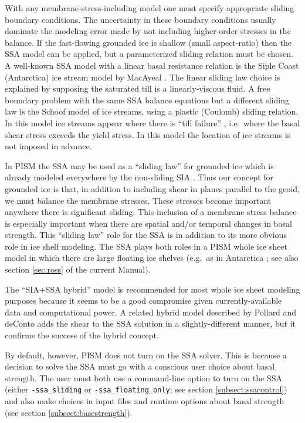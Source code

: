 With any membrane-stress-including model one must specify appropriate sliding boundary conditions.  The uncertainty in these boundary conditions usually dominate the modeling error made by not including higher-order stresses in the balance.  If the fast-flowing grounded ice is shallow (small aspect-ratio) then the SSA model can be applied, but a parameterized sliding relation must be chosen.  A well-known SSA model with a linear basal resistance relation is the Siple Coast (Antarctica) ice stream model by MacAyeal \cite{MacAyeal}.  The linear sliding law choice is explained by supposing the saturated till is a linearly-viscous fluid.  A free boundary problem with the same SSA balance equations but a different sliding law is the Schoof \cite{SchoofStream} model of ice streams, using a plastic (Coulomb) sliding relation.  In this model ice streams appear where there is ``till failure'' \cite{Paterson}, i.e.~where the basal shear stress exceeds the yield stress.  In this model the location of ice streams is not imposed in advance.

In PISM the SSA may be used as a ``sliding law'' for grounded ice which is already modeled everywhere by the non-sliding SIA \cite{BBssasliding,Winkelmannetal2011}.  Thus our concept for grounded ice is that, in addition to including shear in planes parallel to the geoid, we must balance the membrane stresses.  These stresses become important anywhere there is significant sliding.  This inclusion of a membrane stress balance is especially important when there are spatial and/or temporal changes in basal strength.  This ``sliding law'' role for the SSA is in addition to its more obvious role in ice shelf modeling.  The SSA plays both roles in a PISM whole ice sheet model in which there are large floating ice shelves (e.g.~as in Antarctica \cite{Golledgeetal2012ant,Martinetal2011,Winkelmannetal2011}; see also section \ref{sec:ross} of the current Manual).

The ``SIA+SSA hybrid'' model is recommended for most whole ice sheet modeling purposes because it seems to be a good compromise given currently-available data and computational power.  A related hybrid model described by Pollard and deConto \cite{PollardDeConto} adds the shear to the SSA solution in a slightly-different manner, but it confirms the success of the hybrid concept.

By default, however, PISM does not turn on the SSA solver.  This is because a decision to solve the SSA must go with a conscious user choice about basal strength.  The user must both use a command-line option to turn on the SSA (either \texttt{-ssa_sliding} or \texttt{-ssa_floating_only}; see section \ref{subsect:ssacontrol}) and also make choices in input files and runtime options about basal strength (see section \ref{subsect:basestrength}).


